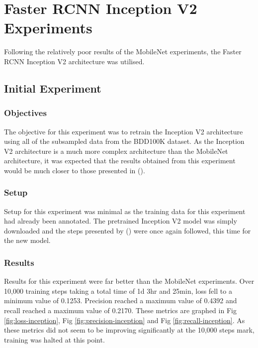 \documentclass[12pt]{report}
\begin{document}
\newpage
\section{Faster RCNN Inception V2 Experiments}
\begin{flushleft}
Following the relatively poor results of the MobileNet experiments, the Faster RCNN Inception V2 architecture was utilised.
\end{flushleft}

\subsection{Initial Experiment}
\subsubsection{Objectives}
\begin{flushleft}
The objective for this experiment was to retrain the Inception V2 architecture using all of the subsampled data from the BDD100K dataset. As the Inception V2 architecture is a much more complex architecture than the MobileNet architecture, it was expected that the results obtained from this experiment would be much closer to those presented in (\cite{yu2018bdd100k}).
\end{flushleft}

\subsubsection{Setup}
\begin{flushleft}
Setup for this experiment was minimal as the training data for this experiment had already been annotated. The pretrained Inception V2 model was simply downloaded and the steps presented by (\cite{tutorial}) were once again followed, this time for the new model.
\end{flushleft}

\subsubsection{Results}
\begin{flushleft}
Results for this experiment were far better than the MobileNet experiments. Over 10,000 training steps taking a total time of 1d 3hr and 25min, loss fell to a minimum value of 0.1253. Precision reached a maximum value of 0.4392 and recall reached a maximum value of 0.2170. These metrics are graphed in Fig \ref{fig:loss-inception}, Fig \ref{fig:precision-inception} and Fig \ref{fig:recall-inception}. As these metrics did not seem to be improving significantly at the 10,000 steps mark, training was halted at this point.
\end{flushleft}
\end{document}
